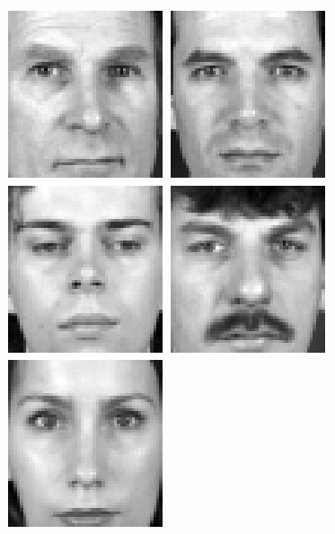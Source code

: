 \begin{figure}[ht]
\begin{center}
\includegraphics[scale=0.12]{ch4/figures/XM2VTS_36.png}
\includegraphics[scale=0.12]{ch4/figures/XM2VTS_37.png}
\includegraphics[scale=0.12]{ch4/figures/XM2VTS_38.png}
\includegraphics[scale=0.12]{ch4/figures/XM2VTS_39.png}
\includegraphics[scale=0.12]{ch4/figures/XM2VTS_40.png}\\

\end{center}
\end{figure}
